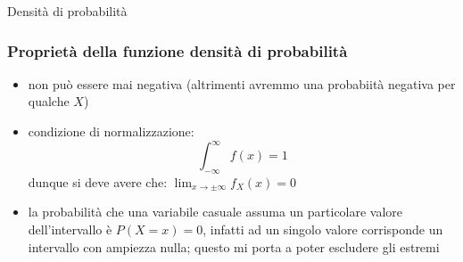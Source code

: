 \documentclass[openany,a4paper,12pt]{book}
\theoremstyle{remark}
\begin{document}
\begin{bressan}{Densità di probabilità}
\subsubsection*{Proprietà della funzione densità di probabilità}
\begin{itemize}
    \item non può essere mai negativa (altrimenti avremmo una probabiità negativa per qualche $X$)
    \item condizione di normalizzazione: \[ \int_{- \infty}^{\infty} f(x)=1\]
    dunque si deve avere che: $\lim_{x \rightarrow \pm \infty} f_X(x)=0$
    \item la probabilità che una variabile casuale assuma un particolare valore dell'intervallo è $P(X=x)=0$, infatti ad un singolo valore corrisponde un intervallo con ampiezza nulla; questo mi porta a poter escludere gli estremi
\end{itemize}
\end{bressan}
\end{document}
